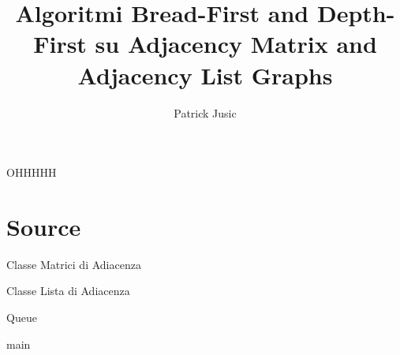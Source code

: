 \documentclass{article}
\title{Algoritmi Bread-First and Depth-First su Adjacency Matrix and Adjacency List Graphs}
\author{Patrick Jusic}
\begin{document}
OHHHHH
\maketitle{}
\section{Source}
Classe Matrici di Adiacenza

Classe Lista di Adiacenza

Queue

main

\end{document}
